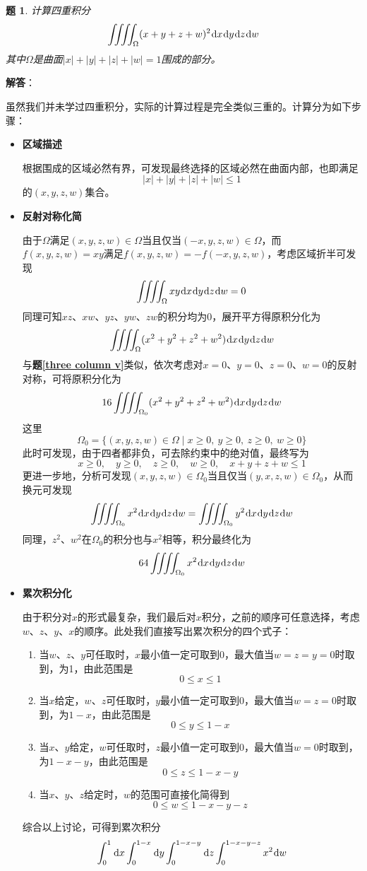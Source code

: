 \documentclass[a4paper,UTF8,fontset=windows,AutoFakeBold]{ctexart}
\newcommand*{\dr}{\hspace{0.07em}\mathrm{d}}
\theoremstyle{ex}
\newtheorem{exercise}{题}
\newcommand{\exref}[1]{\textbf{题\;\ref{#1}\;}}
\newcommand{\sol}[1]{{\vspace{5pt}\kaishu\noindent\textbf{解答}：\vspace{-3pt}
\begin{compactitem}
    \item[] #1
\end{compactitem}
}}
\begin{document}
\begin{framed}
\begin{exercise}
    计算四重积分
    $$\iiiint_\Omega(x+y+z+w)^2\dr x\dr y\dr z\dr w$$
    其中$\Omega$是曲面$|x|+|y|+|z|+|w|=1$围成的部分。
\end{exercise}
\sol{
    虽然我们并未学过四重积分，实际的计算过程是完全类似三重的。计算分为如下步骤：
    \begin{itemize}
        \item \textbf{区域描述}
        
        根据围成的区域必然有界，可发现最终选择的区域必然在曲面内部，也即满足
        $$|x|+|y|+|z|+|w|\le1$$
        的$(x,y,z,w)$集合。

        \item \textbf{反射对称化简}
        
        由于$\Omega$满足$(x,y,z,w)\in\Omega$当且仅当$(-x,y,z,w)\in\Omega$，而$f(x,y,z,w)=xy$满足$f(x,y,z,w)=-f(-x,y,z,w)$，考虑区域折半可发现
        $$\iiiint_\Omega xy\dr x\dr y\dr z\dr w=0$$
        同理可知$xz$、$xw$、$yz$、$yw$、$zw$的积分均为0，展开平方得原积分化为
        $$\iiiint_\Omega(x^2+y^2+z^2+w^2)\dr x\dr y\dr z\dr w$$
        与\exref{three column v}类似，依次考虑对$x=0$、$y=0$、$z=0$、$w=0$的反射对称，可将原积分化为
        $$16\iiiint_{\Omega_0}(x^2+y^2+z^2+w^2)\dr x\dr y\dr z\dr w$$
        这里
        $$\Omega_0=\{(x,y,z,w)\in\Omega\mid x\ge0,\ y\ge0,\ z\ge0,\ w\ge0\}$$
        此时可发现，由于四者都非负，可去除约束中的绝对值，最终写为
        $$x\ge0,\quad y\ge0,\quad z\ge0,\quad w\ge0,\quad x+y+z+w\le1$$
        更进一步地，分析可发现$(x,y,z,w)\in\Omega_0$当且仅当$(y,x,z,w)\in\Omega_0$，从而换元可发现
        $$\iiiint_{\Omega_0}x^2\dr x\dr y\dr z\dr w=\iiiint_{\Omega_0}y^2\dr x\dr y\dr z\dr w$$
        同理，$z^2$、$w^2$在$\Omega_0$的积分也与$x^2$相等，积分最终化为
        $$64\iiiint_{\Omega_0}x^2\dr x\dr y\dr z\dr w$$

        \item \textbf{累次积分化}
        
        由于积分对$x$的形式最复杂，我们最后对$x$积分，之前的顺序可任意选择，考虑$w$、$z$、$y$、$x$的顺序。此处我们直接写出累次积分的四个式子：
        \begin{enumerate}
            \item 当$w$、$z$、$y$可任取时，$x$最小值一定可取到0，最大值当$w=z=y=0$时取到，为1，由此范围是
            $$0\le x\le1$$
            \item 当$x$给定，$w$、$z$可任取时，$y$最小值一定可取到0，最大值当$w=z=0$时取到，为$1-x$，由此范围是
            $$0\le y\le1-x$$
            \item 当$x$、$y$给定，$w$可任取时，$z$最小值一定可取到0，最大值当$w=0$时取到，为$1-x-y$，由此范围是
            $$0\le z\le1-x-y$$
            \item 当$x$、$y$、$z$给定时，$w$的范围可直接化简得到
            $$0\le w\le1-x-y-z$$
        \end{enumerate}
        综合以上讨论，可得到累次积分
        $$\int_0^1\dr x\int_0^{1-x}\dr y\int_0^{1-x-y}\dr z\int_0^{1-x-y-z}x^2\dr w$$


\end{itemize}}
\end{framed}
\end{document}
